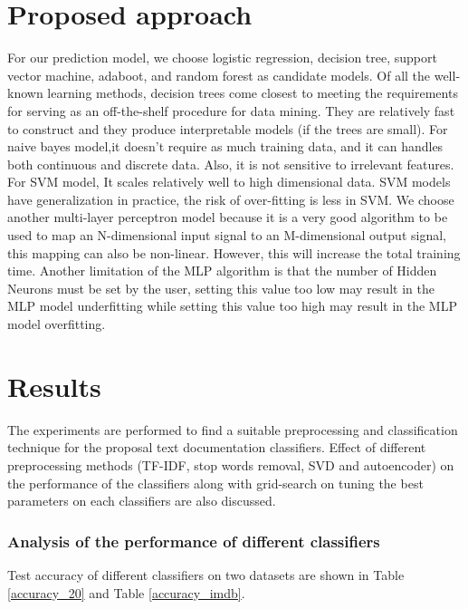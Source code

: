 \documentclass[11pt]{scrartcl}
\begin{document}
\section{Proposed approach}
For our prediction model, we choose logistic regression, decision tree, support vector machine, adaboot, and random forest as candidate models. Of all the well-known learning methods, decision trees come closest to meeting the requirements for serving as an off-the-shelf procedure for data mining. They are relatively fast to construct and they produce interpretable models (if the trees are small). For naive bayes model,it doesn’t require as much training data, and it can handles both continuous and discrete data. Also, it is not sensitive to irrelevant features. For SVM model, It scales relatively well to high dimensional data. SVM models have generalization in practice, the risk of over-fitting is less in SVM. We choose another multi-layer perceptron  model because it is a very good algorithm to be used to map an N-dimensional input signal to an M-dimensional output signal, this mapping can also be non-linear.  However, this will increase the total training time. Another limitation of the MLP algorithm is that the number of Hidden Neurons must be set by the user, setting this value too low may result in the MLP model underfitting while setting this value too high may result in the MLP model overfitting. 




\section{Results}

The experiments are performed to find a suitable preprocessing and classification technique for the proposal text documentation classifiers. Effect of different preprocessing methods (TF-IDF, stop words removal, SVD and autoencoder) on the performance of the classifiers along with grid-search on tuning the best parameters on each classifiers are also discussed.

\subsubsection*{Analysis of the performance of different classifiers}
Test accuracy of different classifiers on two datasets are shown in Table \ref{accuracy_20} and Table \ref{accuracy_imdb}.
\end{document}
